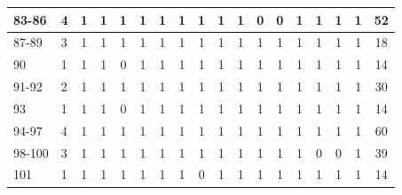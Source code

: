 \begin{table}[htbp]
\begin{center}
{\begin{tabular}{|l|l|c|c|c|c|c|c|c|c|c|c|c|c|c|c|c|c|}
                83-86                                     & 4                                               & 1          & 1          & 1          & 1          & 1          & 1          & 1          & 1          & 1          & 0          & 0          & 1          & 1          & 1          & 1          & 52           \\ \hline
                87-89                                     & 3                                               & 1          & 1          & 1          & 1          & 1          & 1          & 1          & 1          & 1          & 1          & 1          & 1          & 1          & 1          & 1          & 18           \\ \hline
                90                                        & 1                                               & 1          & 1          & 0          & 1          & 1          & 1          & 1          & 1          & 1          & 1          & 1          & 1          & 1          & 1          & 1          & 14           \\ \hline
                91-92                                     & 2                                               & 1          & 1          & 1          & 1          & 1          & 1          & 1          & 1          & 1          & 1          & 1          & 1          & 1          & 1          & 1          & 30           \\ \hline
                93                                        & 1                                               & 1          & 1          & 0          & 1          & 1          & 1          & 1          & 1          & 1          & 1          & 1          & 1          & 1          & 1          & 1          & 14           \\ \hline
                94-97                                     & 4                                               & 1          & 1          & 1          & 1          & 1          & 1          & 1          & 1          & 1          & 1          & 1          & 1          & 1          & 1          & 1          & 60           \\ \hline
                98-100                                    & 3                                               & 1          & 1          & 1          & 1          & 1          & 1          & 1          & 1          & 1          & 1          & 1          & 1          & 0          & 0          & 1          & 39           \\ \hline
                101                                       & 1                                               & 1          & 1          & 1          & 1          & 1          & 1          & 0          & 1          & 1          & 1          & 1          & 1          & 1          & 1          & 1          & 14           \\ \hline

\end{tabular}}
\end{center}
\end{table}
